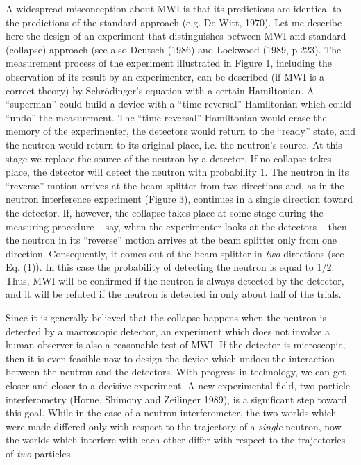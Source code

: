 \documentclass[12pt]{article}
\begin{document}
A widespread misconception about MWI is that its predictions are
identical to the predictions of the standard approach (e.g. De Witt,
1970).  Let me describe here the design of an experiment that
distinguishes between MWI and standard (collapse) approach (see also
Deutsch (1986) and Lockwood (1989, p.223).  The measurement process of
the experiment illustrated in Figure 1, including the observation of
its result by an experimenter, can be described (if MWI is a correct
theory) by Schr\"odinger's equation with a certain Hamiltonian.  A
``superman'' could build a device with a ``time reversal'' Hamiltonian
which could ``undo'' the measurement.  The ``time reversal''
Hamiltonian would erase the memory of the experimenter, the detectors
would return to the ``ready'' state, and the neutron would return to
its original place, i.e. the neutron's source.  At this stage we
replace the source of the neutron by a detector.  If no collapse takes
place, the detector will detect the neutron with probability 1. The
neutron in its ``reverse'' motion arrives at the beam splitter from
two directions and, as in the neutron interference experiment (Figure
3), continues in a single direction toward the detector.  If, however,
the collapse takes place at some stage during the measuring procedure
-- say, when the experimenter looks at the detectors -- then the
neutron in its ``reverse'' motion arrives at the beam splitter only
from one direction.  Consequently, it comes out of the beam splitter
in {\it two} directions (see Eq.  (1)).  In this case the probability
of detecting the neutron is equal to 1/2.  Thus, MWI will be confirmed
if the neutron is always detected by the detector, and it will be
refuted if the neutron is detected in only about half of the trials.

Since it is generally believed that the collapse happens when the
neutron is detected by a macroscopic detector, an experiment which
does not involve a human observer is also a reasonable test of MWI.
If the detector is microscopic, then it is even feasible now to design
the device which undoes the interaction between the neutron and the
detectors.  With progress in technology, we can get closer and closer
to a decisive experiment.  A new experimental field, two-particle
interferometry (Horne, Shimony and Zeilinger 1989), is a significant
step toward this goal.  While in the case of a neutron interferometer,
the two worlds which were made differed only with respect to the
trajectory of a {\it single} neutron, now the worlds which interfere
with each other differ with respect to the trajectories of {\it two}
particles.
 
\end{document}
